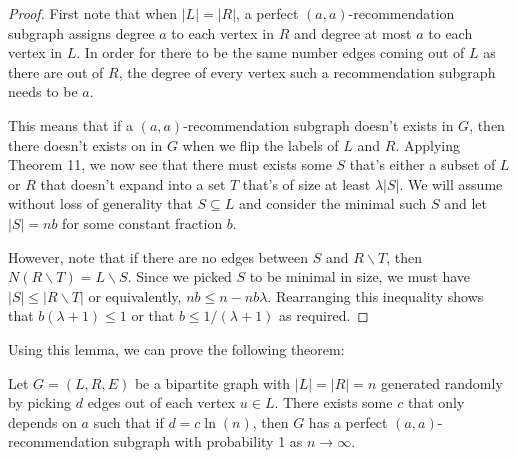 \begin{proof}
First note that when $|L|=|R|$, a perfect $(a,a)$-recommendation subgraph assigns degree $a$ to each vertex in $R$ and degree at most $a$ to each vertex in $L$. In order for there to be the same number edges coming out of $L$ as there are out of $R$, the degree of every vertex such a recommendation subgraph needs to be $a$.\vs

This means that if a $(a,a)$-recommendation subgraph doesn't exists in $G$, then there doesn't exists on in $G$ when we flip the labels of $L$ and $R$. Applying Theorem 11, we now see that there must exists some $S$ that's either a subset of $L$ or $R$ that doesn't expand into a set $T$ that's of size at least $\lambda|S|$. We will assume without loss of generality that $S\subseteq L$ and consider the minimal such $S$ and let $|S|=nb$ for some constant fraction $b$. \vs

However, note that if there are no edges between $S$ and $R\backslash T$, then $N(R\backslash T) = L\backslash S$. Since we picked $S$ to be minimal in size, we must have $|S|\leq |R\backslash T|$ or equivalently, $nb \leq n -nb\lambda$. Rearranging this inequality shows that $b(\lambda+1) \leq 1$ or that $b\leq 1/(\lambda+1)$ as required.
\end{proof}

Using this lemma, we can prove the following theorem:

\begin{thm} 
Let $G=(L,R,E)$ be a bipartite graph with $|L|=|R|=n$ generated randomly by picking $d$ edges out of each vertex $u\in L$. There exists some $c$ that only depends on $a$ such that if $d=c\ln(n)$, then $G$ has a perfect $(a,a)$-recommendation subgraph with probability 1 as $n\to\infty$.
\end{thm}

